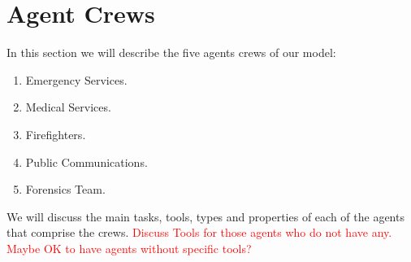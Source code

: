 \section{Agent Crews}\label{sec:agents}
In this section we will describe the five agents crews of our model:
\begin{enumerate}
    \item Emergency Services.
    \item Medical Services.
    \item Firefighters.
    \item Public Communications.
    \item Forensics Team.
\end{enumerate}
We will discuss the main tasks, tools, types and properties of each of the agents that comprise the crews.
\newline\textcolor{red}{Discuss Tools for those agents who do not have any. Maybe OK to have agents without specific tools?}




